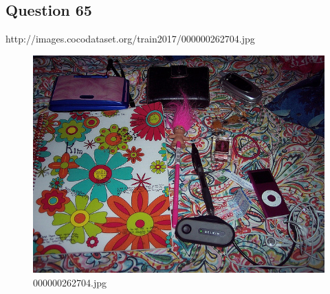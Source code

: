 \subsection*{Question 65}
http://images.cocodataset.org/train2017/000000262704.jpg
\begin{figure}[h]
    \centering
    \includegraphics[width=0.8\linewidth]{../image set/hard/000000262704.jpg}
    \caption{000000262704.jpg}
\end{figure}
